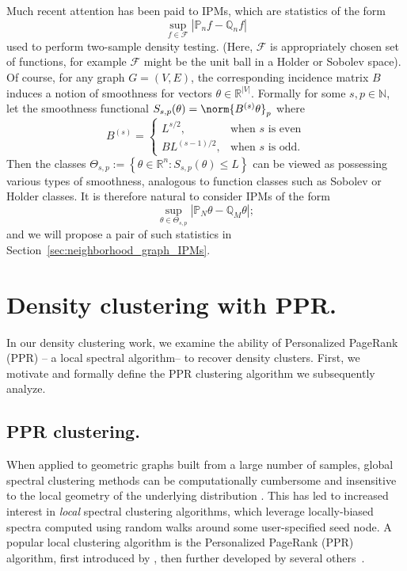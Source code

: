 \documentclass{article}
\newcommand{\Reals}{\mathbb{R}}
\newcommand{\abs}[1]{\left \lvert #1 \right \rvert}
\newcommand{\set}[1]{\left\{#1\right\}}
\newcommand{\1}{\mathbf{1}}
\theoremstyle{alden}
\theoremstyle{aldenthm}
\theoremstyle{definition}
\theoremstyle{remark}
\begin{document}
Much recent attention \citet{muller97,sriperumbudur09,gretton12,mroueh17} has been paid to IPMs, which are statistics of the form
\begin{equation*}
\sup_{f \in \mathcal{F}} \abs{\mathbb{P}_n f - \mathbb{Q}_n f}
\end{equation*}
used to perform two-sample density testing. (Here, $\mathcal{F}$ is appropriately chosen set of functions, for example $\mathcal{F}$ might be the unit ball in a Holder or Sobolev space). Of course, for any graph $G = (V,E)$, the corresponding incidence matrix $B$ induces a notion of smoothness for vectors $\theta \in \Reals^{\abs{V}}$. Formally for some $s,p \in \mathbb{N}$, let the smoothness functional $S_{s,p}(\theta) = \norm{B^{(s)}\theta}_p$ where
\begin{equation*}
B^{(s)} = 
\begin{cases}
L^{s/2}, & \textrm{when $s$ is even} \\
B L^{(s-1)/2}, & \textrm{when $s$ is odd.}
\end{cases}
\end{equation*}
Then the classes $\Theta_{s,p} := \set{\theta \in \Reals^n: S_{s,p}(\theta) \leq L}$ can be viewed as possessing various types of smoothness, analogous to function classes such as Sobolev or Holder classes. It is therefore natural to consider IPMs of the form
\begin{equation*}
\sup_{\theta \in \Theta_{s,p}} \abs{\mathbb{P}_N \theta - \mathbb{Q}_M \theta};
\end{equation*}
and we will propose a pair of such statistics in Section~\ref{sec:neighborhood_graph_IPMs}.

\section{Density clustering with PPR.}

In our density clustering work, we examine the ability of Personalized PageRank (PPR) -- a local spectral algorithm-- to recover density clusters. First, we motivate and formally define the PPR clustering algorithm we subsequently analyze. 

\subsection{PPR clustering.}

When applied to geometric graphs built from a large number of samples,
global spectral clustering methods can be computationally cumbersome and   
insensitive to the local geometry of the underlying distribution
\citep{leskovec2010,mahoney2012}.  This has led to increased interest in
\emph{local} spectral clustering algorithms, which leverage locally-biased spectra
computed using random walks around some user-specified seed node.  A popular 
local clustering algorithm is the Personalized PageRank (PPR) algorithm, first introduced by 
\citet{haveliwala2003}, then further developed by
several others~\citep{spielman2011,spielman2014,andersen2006,mahoney2012,zhu2013}.
\end{document}
